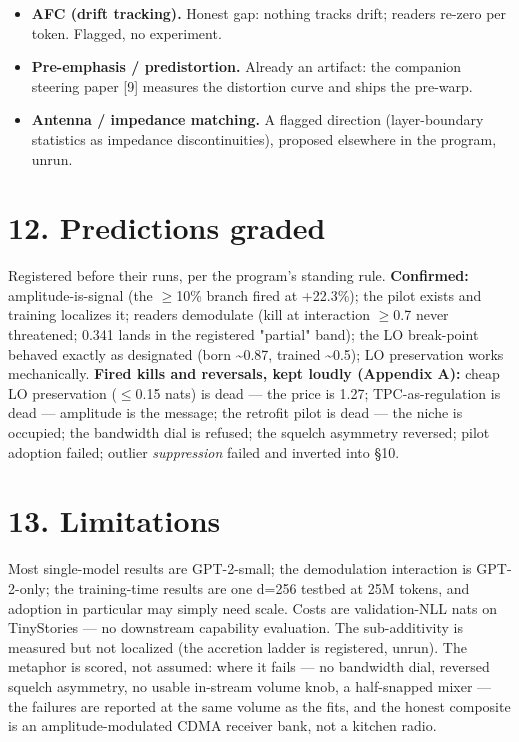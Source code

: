 \documentclass[10pt]{article}
\begin{document}
\begin{itemize}
\item \textbf{AFC (drift tracking).} Honest gap: nothing tracks drift; readers re-zero per token. Flagged, no experiment.
\item \textbf{Pre-emphasis / predistortion.} Already an artifact: the companion steering paper [9] measures the distortion curve and ships the pre-warp.
\item \textbf{Antenna / impedance matching.} A flagged direction (layer-boundary statistics as impedance discontinuities), proposed elsewhere in the program, unrun.
\end{itemize}
\section{12. Predictions graded}

Registered before their runs, per the program's standing rule. \textbf{Confirmed:} amplitude-is-signal
(the $\ge$10\% branch fired at +22.3\%); the pilot exists and training localizes it; readers demodulate
(kill at interaction $\ge$0.7 never threatened; 0.341 lands in the registered "partial" band); the LO
break-point behaved exactly as designated (born \textasciitilde{}0.87, trained \textasciitilde{}0.5); LO preservation works
mechanically. \textbf{Fired kills and reversals, kept loudly (Appendix A):} cheap LO preservation
($\le$0.15 nats) is dead --- the price is 1.27; TPC-as-regulation is dead --- amplitude is the message;
the retrofit pilot is dead --- the niche is occupied; the bandwidth dial is refused; the squelch
asymmetry reversed; pilot adoption failed; outlier \emph{suppression} failed and inverted into §10.

\section{13. Limitations}

Most single-model results are GPT-2-small; the demodulation interaction is GPT-2-only; the
training-time results are one d=256 testbed at 25M tokens, and adoption in particular may simply
need scale. Costs are validation-NLL nats on TinyStories --- no downstream capability evaluation.
The sub-additivity is measured but not localized (the accretion ladder is registered, unrun). The
metaphor is scored, not assumed: where it fails --- no bandwidth dial, reversed squelch asymmetry,
no usable in-stream volume knob, a half-snapped mixer --- the failures are reported at the same
volume as the fits, and the honest composite is an amplitude-modulated CDMA receiver bank, not a
kitchen radio.
\end{document}
